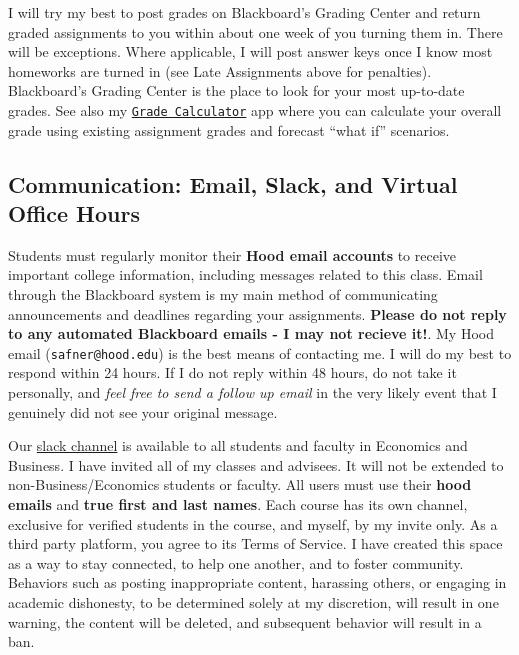\documentclass{article}
\begin{document}
I will try my best to post grades on Blackboard's Grading Center and
return graded assignments to you within about one week of you turning
them in. There will be exceptions. Where applicable, I will post answer
keys once I know most homeworks are turned in (see Late Assignments
above for penalties). Blackboard's Grading Center is the place to look
for your most up-to-date grades. See also my
\href{https://ryansafner.shinyapps.io/480_grade_calculator/}{
\texttt{Grade\ Calculator}} app where you can calculate your overall
grade using existing assignment grades and forecast ``what if''
scenarios.

\hypertarget{communication-email-slack-and-virtual-office-hours}{%
\subsection{Communication: Email, Slack, and Virtual Office
Hours}\label{communication-email-slack-and-virtual-office-hours}}

Students must regularly monitor their \textbf{Hood email accounts} to
receive important college information, including messages related to
this class. Email through the Blackboard system is my main method of
communicating announcements and deadlines regarding your assignments.
\textbf{Please do not reply to any automated Blackboard emails - I may
not recieve it!}. My Hood email (\texttt{safner@hood.edu}) is the best
means of contacting me. I will do my best to respond within 24 hours. If
I do not reply within 48 hours, do not take it personally, and
\emph{feel free to send a follow up email} in the very likely event that
I genuinely did not see your original message.

Our \href{https://hoodcollegeeconomics.slack.com}{slack channel} is
available to all students and faculty in Economics and Business. I have
invited all of my classes and advisees. It will not be extended to
non-Business/Economics students or faculty. All users must use their
\textbf{hood emails} and \textbf{true first and last names}. Each course
has its own channel, exclusive for verified students in the course, and
myself, by my invite only. As a third party platform, you agree to its
Terms of Service. I have created this space as a way to stay connected,
to help one another, and to foster community. Behaviors such as posting
inappropriate content, harassing others, or engaging in academic
dishonesty, to be determined solely at my discretion, will result in one
warning, the content will be deleted, and subsequent behavior will
result in a ban.
\end{document}
